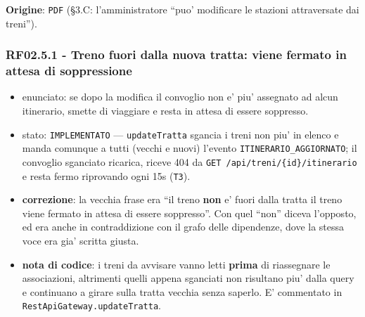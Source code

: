 \documentclass[11pt]{article}
\begin{document}
\textbf{Origine}: \texttt{PDF} (§3.C: l'amministratore ``puo' modificare le stazioni attraversate dai treni'').
\subsubsection{RF02.5.1 - Treno \textbf{fuori} dalla nuova tratta: viene fermato in attesa di soppressione}
\label{sec:orgb8bf073}
\begin{itemize}
\item enunciato: se dopo la modifica il convoglio non e' piu' assegnato ad alcun itinerario, smette di
viaggiare e resta in attesa di essere soppresso.
\item stato: \texttt{IMPLEMENTATO} — \texttt{updateTratta} sgancia i treni non piu' in elenco e manda comunque a tutti
(vecchi e nuovi) l'evento \texttt{ITINERARIO\_AGGIORNATO}; il convoglio sganciato ricarica, riceve 404 da
\texttt{GET /api/treni/\{id\}/itinerario} e resta fermo riprovando ogni 15s (\texttt{T3}).
\item \textbf{correzione}: la vecchia frase era ``il treno \textbf{non} e' fuori dalla tratta il treno viene fermato in
attesa di essere soppresso''. Con quel ``non'' diceva l'opposto, ed era anche in contraddizione con
il grafo delle dipendenze, dove la stessa voce era gia' scritta giusta.
\item \textbf{nota di codice}: i treni da avvisare vanno letti \textbf{prima} di riassegnare le associazioni,
altrimenti quelli appena sganciati non risultano piu' dalla query e continuano a girare sulla
tratta vecchia senza saperlo. E' commentato in \texttt{RestApiGateway.updateTratta}.
\end{itemize}
\end{document}

